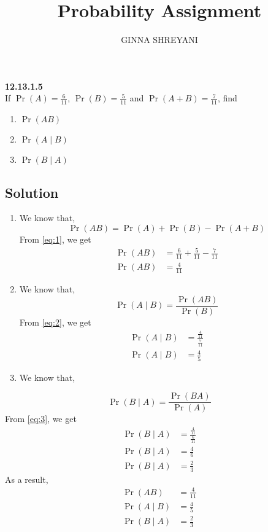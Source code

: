 \documentclass[10pt,twocolumn]{article}
\title{
Probability Assignment
}
\author{GINNA SHREYANI}
\date{}
\begin{document}
\maketitle


\textbf{12.13.1.5}\\
If $\Pr(A)=\frac{6}{11}$, $\Pr(B)=\frac{5}{11}$ and $\Pr(A+B)=\frac{7}{11}$, find
\begin{enumerate}
	\item $\Pr(AB)$   
	\item $\Pr(A \mid B)$  
	\item $\Pr(B\mid A)$
\end{enumerate}
\subsection*{Solution}
\begin{enumerate}
	\item We know that,
\begin{equation}
	\label{eq:1}
	\Pr(AB) = \Pr(A) + \Pr(B) -\Pr(A+B)
\end{equation}
From \eqref{eq:1}, we get
\begin{align}
	\Pr(AB) &= \frac{6}{11} + \frac{5}{11} - \frac{7}{11}\\
	\Pr(AB) &= \frac{4}{11}
\end{align}
	\item We know that,
\begin{equation}
	\Pr(A\mid B) = \frac{\Pr(AB)}{\Pr(B)}
	\label{eq:2}
\end{equation}
From \eqref{eq:2}, we get
\begin{align}
	\Pr(A \mid B) &= \frac{\frac{4}{11}}{\frac{5}{11}}\\
	\Pr(A\mid B) &= \frac{4}{5}
\end{align}
	\item We know that,
\end{enumerate}
\begin{equation}
	\Pr(B\mid A)=\frac{\Pr(BA)}{\Pr(A)}
	\label{eq:3}
\end{equation}
From \eqref{eq:3}, we get
\begin{align}
	\Pr(B\mid A) &= \frac{\frac{4}{11}}{\frac{6}{11}}\\
	\Pr(B\mid A) &= \frac{4}{6}\\
	\Pr(B\mid A) &= \frac{2}{3}
\end{align}
As a result,
\begin{align}
	\Pr(AB) &= \frac{4}{11}\\
	\Pr(A\mid B) &= \frac{4}{5}\\
	\Pr(B\mid A) &= \frac{2}{3}
\end{align}
\end{document}
